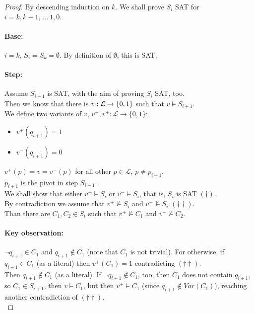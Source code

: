 \begin{proof}
	By descending induction on $k$. We shall prove $S_i$ SAT for $i = k, k-1, \, \dots \, 1 , 0$.
	
	\paragraph{Base:} $i=k$, $S_i = S_k = \emptyset$. By definition of $\emptyset$, this is SAT.
	
	\paragraph{Step:} Assume $S_{i+1}$ is SAT, with the aim of proving $S_i$ SAT, too.\\
	Then we know that there is $v: \mathcal{L} \rightarrow \{0,1\}$ such that $v \models S_{i+1}$.\\
	We define two variants of $v$, $v^-,v^+: \mathcal{L} \rightarrow \{0,1\}$:
	\begin{itemize}
		\item $v^+ (q_{i+1}) = 1$
		\item $v^- (q_{i+1}) = 0$
	\end{itemize}
	$v^+ (p) = v = v^- (p)$ for all other $p \in \mathcal{L}$, $p \neq p_{i+1}$.\\
	$p_{i+1}$ is the pivot in step $S_{i+1}$.\\
	
	We shall show that either $v^+ \models S_i$ or $v^- \models S_i$, that is, $S_i$ is SAT $(\dag)$.\\
	
	By contradiction we assume that $v^+ \not \models S_i$ and $v^- \not \models S_i$ $(\dag \dag)$.\\
	Than there are $C_1, C_2 \in S_i$ such that $v^+ \not \models C_1$ and $v^- \not \models C_2$.
	
	\paragraph{Key observation:} $\neg q_{i+1} \in C_1$ and $q_{i+1} \notin C_1$ (note that $C_1$ is not trivial). For otherwise, if $q_{i+1} \in C_1$ (as a literal) then $v^+(C_1) = 1$ contradicting $(\dag \dag)$.\\
	Then $q_{i+1} \notin C_1$ (as a literal). If $\neg q_{i+1} \notin C_1$, too, then $C_1$ does not contain $q_{i+1}$, so $C_1 \in S_{i+1}$, then $v \models C_1$, but then $v^+ \models C_1$ (since $q_{i+1} \notin Var (C_1)$), reaching another contradiction of $(\dag \dag)$.\\
	

\end{proof}
